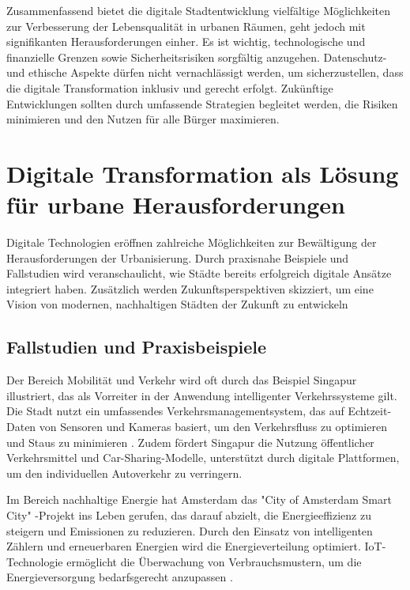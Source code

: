 \documentclass[conference,compsoc,final,a4paper, onecolumn, 11pt]{IEEEtran}
\begin{document}
Zusammenfassend bietet die digitale Stadtentwicklung vielfältige Möglichkeiten zur Verbesserung der Lebensqualität in urbanen Räumen, geht jedoch mit signifikanten Herausforderungen einher. 
Es ist wichtig, technologische und finanzielle Grenzen sowie Sicherheitsrisiken sorgfältig anzugehen. 
Datenschutz- und ethische Aspekte dürfen nicht vernachlässigt werden, um sicherzustellen, dass die digitale Transformation inklusiv und gerecht erfolgt. 
Zukünftige Entwicklungen sollten durch umfassende Strategien begleitet werden, die Risiken minimieren und den Nutzen für alle Bürger maximieren.


\section{Digitale Transformation als Lösung für urbane Herausforderungen}
Digitale Technologien eröffnen zahlreiche Möglichkeiten zur Bewältigung der Herausforderungen der Urbanisierung. 
Durch praxisnahe Beispiele und Fallstudien wird veranschaulicht, wie Städte bereits erfolgreich digitale Ansätze integriert haben. 
Zusätzlich werden Zukunftsperspektiven skizziert, um eine Vision von modernen, nachhaltigen Städten der Zukunft zu entwickeln

\subsection{Fallstudien und Praxisbeispiele}
Der Bereich Mobilität und Verkehr wird oft durch das Beispiel Singapur illustriert, das als Vorreiter in der Anwendung intelligenter Verkehrssysteme gilt. 
Die Stadt nutzt ein umfassendes Verkehrsmanagementsystem, das auf Echtzeit-Daten von Sensoren und Kameras basiert, um den Verkehrsfluss zu optimieren und Staus zu minimieren \autocite{Chin2020}. 
Zudem fördert Singapur die Nutzung öffentlicher Verkehrsmittel und Car-Sharing-Modelle, unterstützt durch digitale Plattformen, um den individuellen Autoverkehr zu verringern.

Im Bereich nachhaltige Energie hat Amsterdam das "City of Amsterdam Smart City" -Projekt ins Leben gerufen, das darauf abzielt, die Energieeffizienz zu steigern und Emissionen zu reduzieren. 
Durch den Einsatz von intelligenten Zählern und erneuerbaren Energien wird die Energieverteilung optimiert. 
\ac{IoT}-Technologie ermöglicht die Überwachung von Verbrauchsmustern, um die Energieversorgung bedarfsgerecht anzupassen \autocite{Amsterdam2021}.
\end{document}
